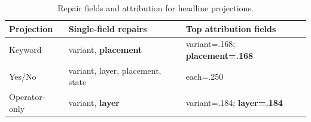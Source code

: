 \begin{table}[t]
\centering
\caption{Repair fields and attribution for headline projections.}
\label{tab:field-repair}
\footnotesize
\begin{tabular}{@{}>{\raggedright\arraybackslash}p{0.68in}>{\raggedright\arraybackslash}p{1.18in}>{\raggedright\arraybackslash}p{1.12in}@{}}
\toprule
Projection & Single-field repairs & Top attribution fields \\
\midrule
Keyword & variant, \textbf{placement} & variant=.168; \textbf{placement=.168} \\
Yes/No & variant, layer, placement, state & each=.250 \\
Operator-only & variant, \textbf{layer} & variant=.184; \textbf{layer=.184} \\
\bottomrule
\end{tabular}
\end{table}

